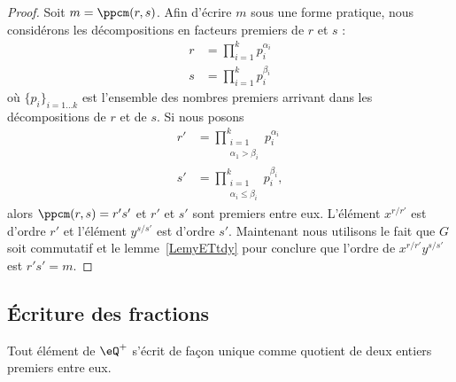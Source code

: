 \begin{proof}
    Soit \( m=\ppcm(r,s)\). Afin d'écrire \( m\) sous une forme pratique, nous considérons les décompositions en facteurs premiers de \( r\) et \( s\) :
    \begin{subequations}
        \begin{align}
            r&=\prod_{i=1}^kp_i^{\alpha_i}\\
            s&=\prod_{i=1}^kp_i^{\beta_i}
        \end{align}
    \end{subequations}
    où \( \{ p_i \}_{i=1\ldots k}\) est l'ensemble des nombres premiers arrivant dans les décompositions de \( r\) et de \( s\). Si nous posons
    \begin{subequations}
        \begin{align}
            r'&=\prod_{\substack{i=1\\\alpha_1>\beta_i}}^kp_i^{\alpha_i}\\
            s'&=\prod_{\substack{i=1\\\alpha_i\leq \beta_i}}^kp_i^{\beta_i},
        \end{align}
    \end{subequations}
    alors \( \ppcm(r,s)=r's'\) et \( r'\) et \( s'\) sont premiers entre eux. L'élément \( x^{r/r'}\) est d'ordre \( r'\) et l'élément \( y^{s/s'}\) est d'ordre \( s'\). Maintenant nous utilisons le fait que \( G\) soit commutatif et le lemme~\ref{LemyETtdy} pour conclure que l'ordre de \( x^{r/r'}y^{s/s'}\) est \( r's'=m\).
\end{proof}

\subsection{Écriture des fractions}

\begin{theorem}     \label{THOooWYQVooRBaAAM}
    Tout élément de \( \eQ^+\) s'écrit de façon unique comme quotient de deux entiers premiers entre eux.
\end{theorem}

